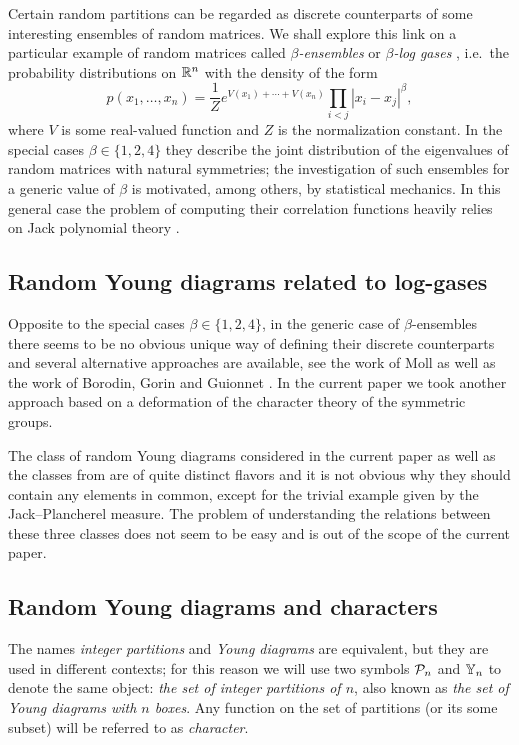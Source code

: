 \documentclass[12pt,usenames,dvipsnames,svgnames,table]{amsart}
\begin{document}
Certain random partitions can be regarded as discrete counterparts of
some interesting ensembles of random matrices. 
We shall explore this link on a particular example of 
random matrices called 
\emph{$\beta$-ensembles} or \emph{$\beta$-log gases} \cite{Forrester},
i.e.~the probability distributions on $\mathbb{R}^n$ with the density of the form
\[ p(x_1,\dots,x_n) =  \frac{1}{Z} e^{V(x_1)+\cdots+V(x_n)}  \prod_{i<j} |x_i - x_j|^{\beta}, \]
where $V$ is some real-valued function and $Z$ is the normalization constant.
In the special cases $\beta\in\{1,2,4\}$ they describe 
the joint distribution of the eigenvalues of random matrices with natural symmetries;
the investigation of such ensembles for a generic value of $\beta$
is motivated, among others, by statistical mechanics. In this general
case the problem of computing their correlation functions heavily
relies on Jack polynomial theory \cite[Chapter 13]{Forrester}.

\subsection{Random Young diagrams related to log-gases}
Opposite to the special cases $\beta\in\{1,2,4\}$,
in the generic case of $\beta$-ensembles there seems to be no obvious unique 
way of defining their discrete counterparts and several alternative
approaches are available, see the work of Moll \cite{Moll2015}
as well as the work of
Borodin, Gorin and Guionnet \cite{BorodinGorinGuionnet2015}.
In the current paper we took another approach 
based on a deformation of the character theory of the symmetric groups.

The class of random Young diagrams considered in the current paper
as well as the classes from \cite{Moll2015,BorodinGorinGuionnet2015} are of quite distinct
flavors and it is not obvious why they should contain any elements in common,
except for the trivial example given by the Jack--Plancherel measure.
The problem of understanding the relations between these three classes
does not seem to be easy and is out of the scope of the current paper.

\subsection{Random Young diagrams and characters}

The names \emph{integer partitions} and \emph{Young diagrams} are equivalent,
but they are used in different contexts; for this reason we will use two 
symbols $\mathcal{P}_{n}$ and $\mathbb{Y}_{n}$ to denote the same object:
\emph{the set of integer partitions of $n$}, also known as
\emph{the set of Young diagrams with $n$ boxes}.
Any function on the set of partitions (or its some subset) will be referred to 
as \emph{character}.
\end{document}
